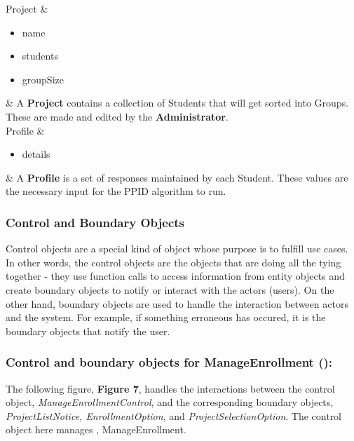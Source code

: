 \documentclass[12pt,letterpaper]{article}
\begin{document}
\begin{table}[H]
\begin{tabu}
		Project & 
		\begin{minipage}[t]{\linewidth}
			\begin{itemize}
				\item name
				\item students
				\item groupSize
			\end{itemize}
		\end{minipage} & 
		A \textbf{Project} contains a collection of Students that will get sorted into Groups. These are made and edited by the \textbf{Administrator}.\\

		Profile & 
		\begin{minipage}[t]{\linewidth}
			\begin{itemize}
				\item details
			\end{itemize}
		\end{minipage} & 
		A \textbf{Profile} is a set of responses maintained by each Student. These values are the necessary input for the PPID algorithm to run.\\
	\end{tabu}
\end{table}

\subsubsection*{Control and Boundary Objects}

Control objects are a special kind of object whose purpose is to fulfill use cases. In other words, the control objects are the objects that 
are doing all the tying together - they use function calls to access information from entity objects and create boundary objects to notify 
or interact with the actors (users). On the other hand, boundary objects are used to handle the interaction between actors and the system.
For example, if something erroneous has occured, it is the boundary objects that notify the user.

\newpage{}

\subsubsection*{Control and boundary objects for ManageEnrollment (\manageenrollment{}):}

The following figure, {\bf Figure 7}, handles the interactions between the control object, {\it ManageEnrollmentControl}, and the corresponding
boundary objects, {\it ProjectListNotice, EnrollmentOption}, and {\it ProjectSelectionOption}. The control object here manages \manageenrollment{},
ManageEnrollment.
\end{document}
